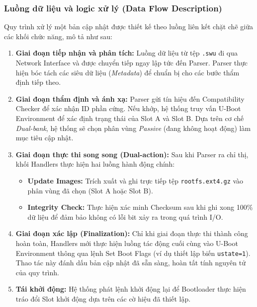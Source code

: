 \subsubsection{Luồng dữ liệu và logic xử lý (Data Flow Description)}

Quy trình xử lý một bản cập nhật được thiết kế theo luồng liên kết chặt chẽ giữa các khối chức năng, mô tả như sau:

\begin{enumerate}
    \item \textbf{Giai đoạn tiếp nhận và phân tích:} Luồng dữ liệu từ tệp \texttt{.swu} đi qua Network Interface và được chuyển tiếp ngay lập tức đến Parser. Parser thực hiện bóc tách các siêu dữ liệu (\textit{Metadata}) để chuẩn bị cho các bước thẩm định tiếp theo.

    \item \textbf{Giai đoạn thẩm định và ánh xạ:} Parser gửi tín hiệu đến Compatibility Checker để xác nhận ID phần cứng. Nếu khớp, hệ thống truy vấn U-Boot Environment để xác định trạng thái của Slot A và Slot B. Dựa trên cơ chế \textit{Dual-bank}, hệ thống sẽ chọn phân vùng \textit{Passive} (đang không hoạt động) làm mục tiêu cập nhật.

    \item \textbf{Giai đoạn thực thi song song (Dual-action):} Sau khi Parser ra chỉ thị, khối Handlers thực hiện hai luồng hành động chính:
    \begin{itemize}
        \item \textbf{Update Images:} Trích xuất và ghi trực tiếp tệp \texttt{rootfs.ext4.gz} vào phân vùng đã chọn (Slot A hoặc Slot B).

        \item \textbf{Integrity Check:} Thực hiện xác minh Checksum sau khi ghi xong 100\% dữ liệu để đảm bảo không có lỗi bit xảy ra trong quá trình I/O.
    \end{itemize}

    \item \textbf{Giai đoạn xác lập (Finalization):} Chỉ khi giai đoạn thực thi thành công hoàn toàn, Handlers mới thực hiện luồng tác động cuối cùng vào U-Boot Environment thông qua lệnh Set Boot Flags (ví dụ thiết lập biến \texttt{ustate=1}). Thao tác này đánh dấu bản cập nhật đã sẵn sàng, hoàn tất tính nguyên tử của quy trình.

    \item \textbf{Tái khởi động:} Hệ thống phát lệnh khởi động lại để Bootloader thực hiện tráo đổi Slot khởi động dựa trên các cờ hiệu đã thiết lập.
\end{enumerate}

